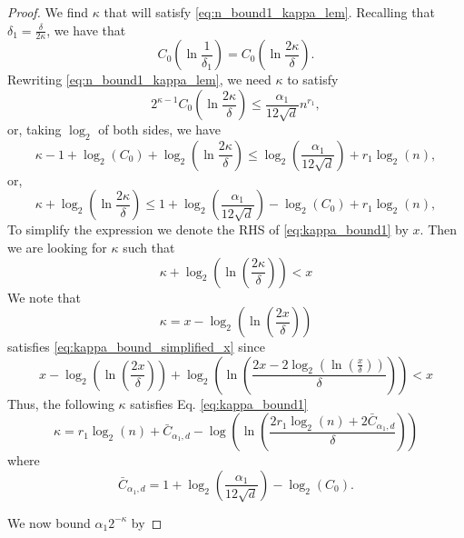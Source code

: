 \documentclass[12pt]{article}
\theoremstyle{remark}
\begin{document}
\begin{appendices}
\begin{proof}
We find $\kappa$ that will satisfy \eqref{eq:n_bound1_kappa_lem}. Recalling that $\delta_1 = \frac{\delta}{2\kappa}$, we have that
	\[
    C_0 \left(\ln \frac{1}{\delta_1}\right) = C_0 \left(\ln \frac{2\kappa}{\delta}\right).
	\]
Rewriting \eqref{eq:n_bound1_kappa_lem}, we need $\kappa$ to satisfy
    \begin{equation}
        2^{\kappa-1}C_0\left(\ln \frac{2\kappa}{\delta}\right) \leq \frac{ \alpha_1}{12\sqrt{d}}n^{r_1},
    \end{equation}
    or, taking $\log_2$ of both sides, we have
    \begin{equation}
        \kappa - 1 +\log_2(C_0 ) + \log_2\left(\ln \frac{2\kappa}{\delta}\right) \leq \log_2\left(\frac{ \alpha_1}{12\sqrt{d}}\right) + r_1\log_2(n),
    \end{equation}
    or, 
    \begin{equation}\label{eq:kappa_bound1}
        \kappa  + \log_2\left(\ln \frac{2\kappa}{\delta}\right) \leq 1 + \log_2\left(\frac{ \alpha_1}{12\sqrt{d}}\right) -\log_2(C_0 ) +  r_1\log_2(n),
    \end{equation}
    To simplify the expression we denote the RHS of \eqref{eq:kappa_bound1} by $x$. Then we are looking for $\kappa$ such that
    \begin{equation}\label{eq:kappa_bound_simplified_x}
    \kappa+\log_2\left(\ln\left(\frac{2\kappa}{\delta}\right)\right) < x     
    \end{equation}
    We note that 
    \[
    \kappa = x-\log_2\left(\ln\left(\frac{2x}{\delta}\right)\right)
    \]
    satisfies \eqref{eq:kappa_bound_simplified_x} since
    \[
    x-\log_2\left(\ln\left(\frac{2x}{\delta}\right)\right)   +   \log_2\left(\ln\left( \frac{2x-2\log_2\left(\ln\left(\frac{x}{\delta}\right)\right)}{\delta} \right) \right)<x
    \]
    Thus, the following $\kappa$ satisfies Eq. \eqref{eq:kappa_bound1}
    \begin{equation}\label{eq:kappa_res}
        \kappa = r_1\log_2(n) + \bar{C}_{ \alpha_1,d} - \log\left(\ln\left(\frac{2r_1\log_2(n) + 2\bar{C}_{ \alpha_1,d}}{\delta}\right)\right)
    \end{equation}
    where 
    \[
    \bar{C}_{ \alpha_1,d} = 1 + \log_2\left(\frac{ \alpha_1}{12\sqrt{d}}\right) -\log_2(C_0 ).
    \]
    
    We now bound $ \alpha_1 2^{-\kappa}$ by 
    

\end{proof}
\end{appendices}
\end{document}
